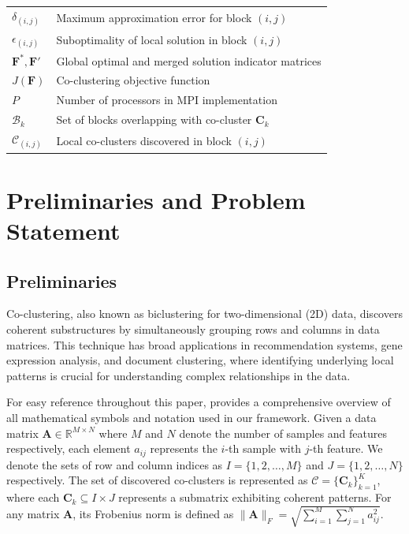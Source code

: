 \documentclass[journal]{IEEEtran}
\theoremstyle{definition}
\theoremstyle{remark} %
\begin{document}
{\begin{table}[htbp]
\begin{tabular}{@{} p{} p{} @{}}
                $\delta_{(i,j)}$                   & Maximum approximation error for block $(i,j)$                                   \\
                $\epsilon_{(i,j)}$                 & Suboptimality of local solution in block $(i,j)$                                \\
                $\mathbf{F}^*, \mathbf{F}'$        & Global optimal and merged solution indicator matrices                           \\
                $J(\mathbf{F})$                    & Co-clustering objective function                                                \\
                $P$                                & Number of processors in MPI implementation                                      \\
                $\mathcal{B}_k$                    & Set of blocks overlapping with co-cluster $\mathbf{C}_k$                        \\
                $\mathcal{C}_{(i,j)}$              & Local co-clusters discovered in block $(i,j)$                                   \\
                \bottomrule
            \end{tabular}
        \end{table}
    }

\section{Preliminaries and Problem Statement}
\label{sec:problem-formulation}
\subsection{Preliminaries}
Co-clustering, also known as biclustering for two-dimensional (2D) data, discovers coherent substructures by simultaneously grouping rows and columns in data matrices. This technique has broad applications in recommendation systems, gene expression analysis, and document clustering, where identifying underlying local patterns is crucial for understanding complex relationships in the data.

    {\color{blue} For easy reference throughout this paper,  provides a comprehensive overview of all mathematical symbols and notation used in our framework.} Given a data matrix $\mathbf{A} \in \mathbb{R}^{M \times N}$ where $M$ and $N$ denote the number of samples and features respectively, each element $a_{ij}$ represents the $i$-th sample with $j$-th feature. We denote the sets of row and column indices as $I = \{1,2,\ldots,M\}$ and $J = \{1,2,\ldots,N\}$ respectively. The set of discovered co-clusters is represented as $\mathcal{C} = \{\mathbf{C}_k\}_{k=1}^K$, where each $\mathbf{C}_k \subseteq I \times J$ represents a submatrix exhibiting coherent patterns. For any matrix $\mathbf{A}$, its Frobenius norm is defined as $\|\mathbf{A}\|_F = \sqrt{\sum_{i=1}^M \sum_{j=1}^N a_{ij}^2}$.
\end{document}
